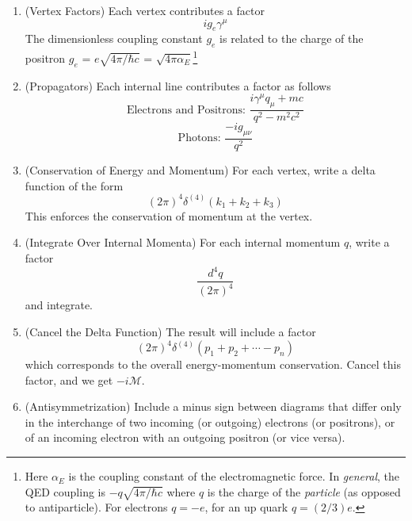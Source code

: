 \begin{enumerate}
\item{(Vertex Factors)} Each vertex contributes a factor
\begin{equation}
ig_{e}\gamma^\mu
\end{equation}
The dimensionless coupling constant $g_e$ is related to the charge of the
positron $g_e$ = $e\sqrt{4\pi/\hbar c}$ = $\sqrt{4\pi\alpha_E}$\footnote{Here
$\alpha_E$ is the coupling constant of the electromagnetic force. In \emph{general},
the QED coupling is $-q\sqrt{4\pi/\hbar c}$ where $q$ is the charge of the \emph{particle}
(as opposed to antiparticle). For electrons $q=-e$, for an up quark $q=(2/3)e$.}
\item{(Propagators)} Each internal line contributes a factor as follows
\begin{equation}
\mbox{Electrons and Positrons: }\frac{i\gamma^\mu q_\mu + mc}{q^2 - m^2c^2}
\end{equation}
\begin{equation}
\mbox{Photons: }\frac{-ig_{\mu\nu}}{q^2}
\end{equation}
\item{(Conservation of Energy and Momentum)} For each vertex, write a delta 
function of the form
\begin{equation}
(2\pi)^4\delta^{(4)}(k_1 + k_2 + k_3)
\end{equation}
This enforces the conservation of momentum at the vertex.
\item{(Integrate Over Internal Momenta)} For each internal momentum $q$, write
a factor
\begin{equation}
\frac{d^4 q}{(2\pi)^4}
\end{equation}
and integrate.
\item{(Cancel the Delta Function)} The result will include a factor
\begin{equation}
(2\pi)^4\delta^{(4)}(p_1 + p_2 + \cdots - p_n)
\end{equation}
which corresponds to the overall energy-momentum conservation. Cancel this factor,
and we get $-i\mathcal{M}$.
\item{(Antisymmetrization)} Include a minus sign between diagrams that differ
only in the interchange of two incoming (or outgoing) electrons (or positrons),
or of an incoming electron with an outgoing positron (or vice versa).
\end{enumerate}

